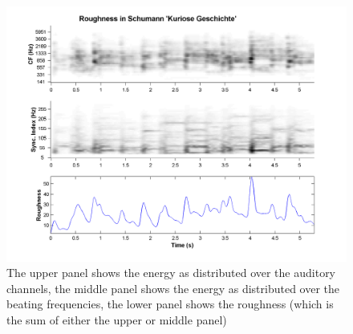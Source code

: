 \begin{figure}[h]
    \centering
    \includegraphics[width=\IPEMDefaultFigureWidth]{Graphics/RMRoughness}
    \caption{The upper panel shows the energy as distributed over the
    auditory channels, the middle panel shows the energy as
    distributed over the beating frequencies, the lower panel
    shows the roughness (which is the sum of either the upper or
    middle panel)}
    \label{Fig:RMRoughness}
\end{figure}

